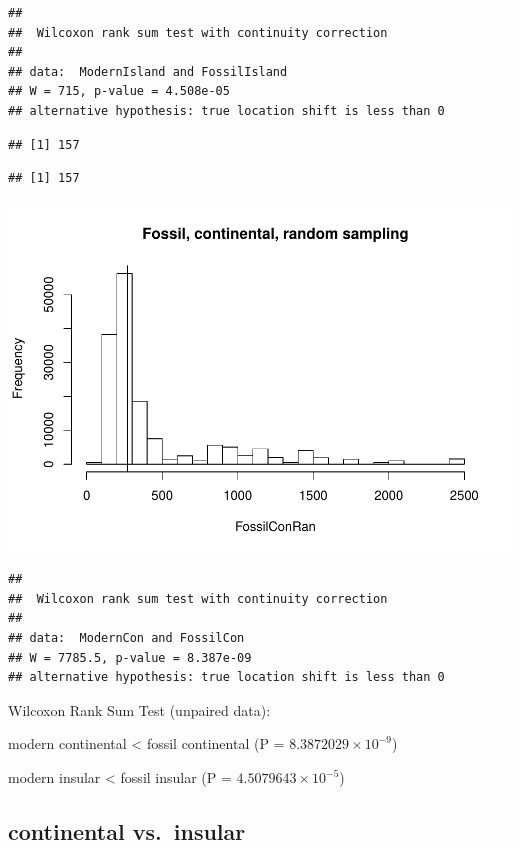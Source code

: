\documentclass[]{article}
\begin{document}
\begin{verbatim}
## 
##  Wilcoxon rank sum test with continuity correction
## 
## data:  ModernIsland and FossilIsland
## W = 715, p-value = 4.508e-05
## alternative hypothesis: true location shift is less than 0
\end{verbatim}

\begin{verbatim}
## [1] 157
\end{verbatim}

\begin{verbatim}
## [1] 157
\end{verbatim}

\includegraphics{MA_JJ_files/figure-latex/RSMFCI-2.pdf}

\begin{verbatim}
## 
##  Wilcoxon rank sum test with continuity correction
## 
## data:  ModernCon and FossilCon
## W = 7785.5, p-value = 8.387e-09
## alternative hypothesis: true location shift is less than 0
\end{verbatim}

Wilcoxon Rank Sum Test (unpaired data):

modern continental \textless{} fossil continental (P =
\(8.3872029\times 10^{-9}\))

modern insular \textless{} fossil insular (P =
\(4.5079643\times 10^{-5}\))

\newpage

\subsection{continental vs.~insular}\label{continental-vs.insular-1}
\end{document}
